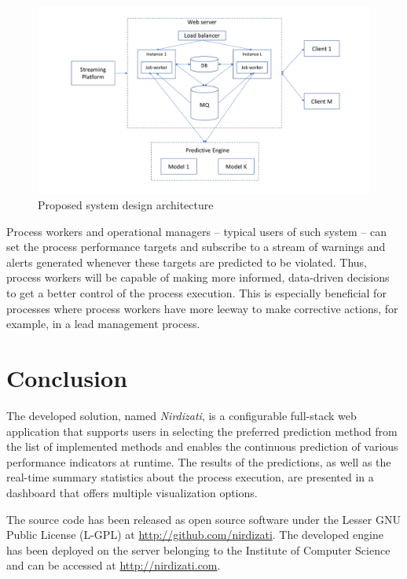 \documentclass[runningheads,a4paper]{llncs}
\begin{document}
\begin{figure}
	\centering
	\includegraphics[width=1\textwidth]{img/nirdizati-runtime}
	\caption{Proposed system design architecture}
	\label{fig:nirdizati-runtime}
\end{figure}

Process workers and operational managers – typical users of such system – can set the process performance targets and subscribe to a stream of warnings and alerts generated whenever these targets are predicted to be violated. Thus, process workers will be capable of making more informed, data-driven decisions to get a better control of the process execution. This is especially beneficial for processes where process workers have more leeway to make corrective actions, for example, in a lead management process.

\section{Conclusion} \label{sec:conclusion}
The developed solution, named \emph{Nirdizati}, is a configurable full-stack web application that supports users in selecting the preferred prediction method from the list of implemented methods and enables the continuous prediction of various performance indicators at runtime.
The results of the predictions, as well as the real-time summary statistics about the process execution, are presented in a dashboard that offers multiple visualization options.

The source code has been released as open source software under the Lesser GNU Public License (L-GPL) at \url{http://github.com/nirdizati}. The developed engine has been deployed on the server belonging to the Institute of Computer Science and can be accessed at \url{http://nirdizati.com}.


\end{document}
